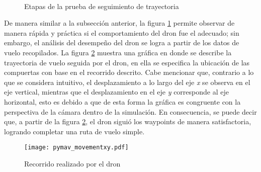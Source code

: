 \begin{figure}[ht]
    \centering
    \hfill
    \\
    \hfill
    \hfill

    \caption{Etapas de la prueba de seguimiento de trayectoria}
    \label{fig:pymav_movement}
\end{figure}

De manera similar a la subsección anterior, la figura \ref{fig:pymav_movement} permite observar de manera rápida y práctica si el comportamiento del dron fue el adecuado; sin embargo, el análisis del desempeño del dron se logra a partir de los datos de vuelo recopilados. La figura \ref{fig:pymav_movementxy} muestra una gráfica en donde se describe la trayectoria de vuelo seguida por el dron, en ella se especifica la ubicación de las compuertas con base en el recorrido descrito. Cabe mencionar que, contrario a lo que se considera intuitivo, el desplazamiento a lo largo del eje \textit{x} se observa en el eje vertical, mientras que el desplazamiento en el eje \textit{y} corresponde al eje horizontal, esto es debido a que de esta forma la gráfica es congruente con la perspectiva de la cámara dentro de la simulación. En consecuencia, se puede decir que, a partir de la figura \ref{fig:pymav_movementxy}, el dron siguió los waypoints de manera satisfactoria, logrando completar una ruta de vuelo simple. 

\begin{figure}[ht]
    \centering
    \texttt{[image: pymav\_movementxy.pdf]}
    \caption{Recorrido realizado por el dron}
    \label{fig:pymav_movementxy}
\end{figure}

